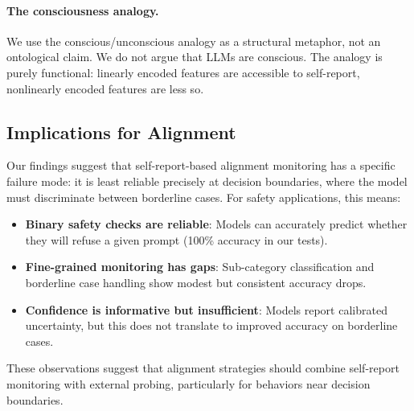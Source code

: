 \paragraph{The consciousness analogy.}
We use the conscious/unconscious analogy as a structural metaphor, not an ontological claim. We do not argue that LLMs are conscious. The analogy is purely functional: linearly encoded features are accessible to self-report, nonlinearly encoded features are less so.

\subsection{Implications for Alignment}

Our findings suggest that self-report-based alignment monitoring has a specific failure mode: it is least reliable precisely at decision boundaries, where the model must discriminate between borderline cases. For safety applications, this means:

\begin{itemize}[leftmargin=*,itemsep=2pt,topsep=2pt]
    \item \textbf{Binary safety checks are reliable}: Models can accurately predict whether they will refuse a given prompt (100\% accuracy in our tests).
    \item \textbf{Fine-grained monitoring has gaps}: Sub-category classification and borderline case handling show modest but consistent accuracy drops.
    \item \textbf{Confidence is informative but insufficient}: Models report calibrated uncertainty, but this does not translate to improved accuracy on borderline cases.
\end{itemize}

These observations suggest that alignment strategies should combine self-report monitoring with external probing, particularly for behaviors near decision boundaries.
